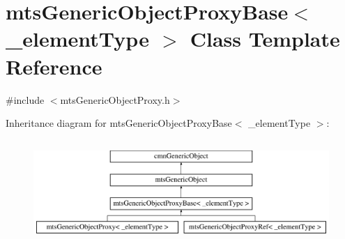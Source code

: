 \hypertarget{classmts_generic_object_proxy_base}{}\section{mts\+Generic\+Object\+Proxy\+Base$<$ \+\_\+element\+Type $>$ Class Template Reference}
\label{classmts_generic_object_proxy_base}


{\ttfamily \#include $<$mts\+Generic\+Object\+Proxy.\+h$>$}

Inheritance diagram for mts\+Generic\+Object\+Proxy\+Base$<$ \+\_\+element\+Type $>$\+:\begin{figure}[H]
\begin{center}
\leavevmode
\includegraphics[height=3.957597cm]{da/d84/classmts_generic_object_proxy_base}
\end{center}
\end{figure}

